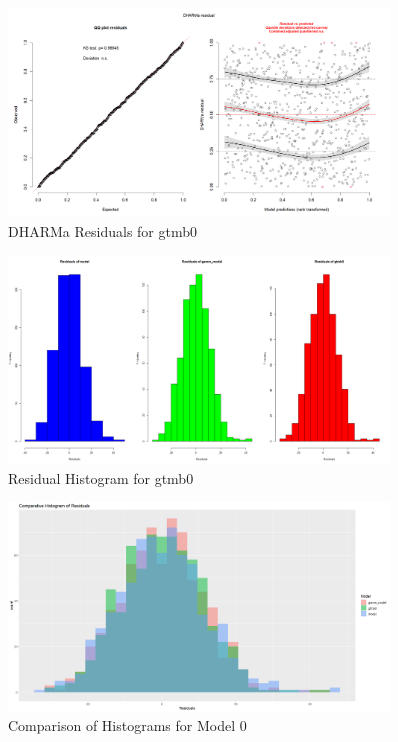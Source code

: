 \begin{figure}[h]
    \centering
    \includegraphics[width=0.9\textwidth]{visuals/DHARMa_gtmb0.png}
    \caption{DHARMa Residuals for gtmb0}
    \label{fig:dharmagtmb0}
\end{figure}

\begin{figure}[h]
    \centering
    \includegraphics[width=0.9\textwidth]{visuals/residialhist_0.png}
    \caption{Residual Histogram for gtmb0}
    \label{fig:residhist0}
\end{figure}

\begin{figure}[h]
    \centering
    \includegraphics[width=0.9\textwidth]{visuals/comparehists_0.png}
    \caption{Comparison of Histograms for Model 0}
    \label{fig:comparehists0}
\end{figure}

